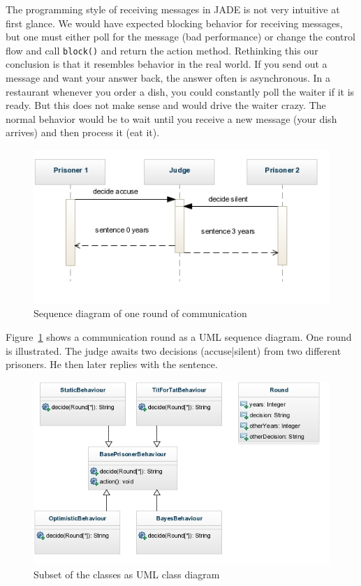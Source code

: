 \documentclass{acm_proc_article-sp}
\begin{document}
The programming style of receiving messages in JADE is not very intuitive at first glance.
We would have expected blocking behavior for receiving messages, but one must either
poll for the message (bad performance) or change the control flow and call \lstinline!block()! 
and return the action method. Rethinking this our conclusion is that it resembles behavior in the real world. If you send out a message and want your answer back, the answer often is
asynchronous. In a restaurant whenever you order a dish, you could constantly poll the waiter if it is ready. But this does not make sense and would drive the waiter crazy. The normal
behavior would be to wait until you receive a new message (your dish arrives) and then process it (eat it).

\begin{figure}
\begin{center}
\includegraphics{dilemma-sequence}
\end{center}
\caption{Sequence diagram of one round of communication}
\label{fig:dilemma-sequence}
\end{figure}

Figure~\ref{fig:dilemma-sequence} shows a communication round as a UML sequence diagram.
One round is illustrated. The judge awaits two decisions (accuse|silent) from two different
prisoners. He then later replies with the sentence.

\begin{figure}
\begin{center}
\includegraphics{dilemma-minimal-classes}
\end{center}
\caption{Subset of the classes as UML class diagram}
\label{fig:dilemma-classes}
\end{figure}
\end{document}
